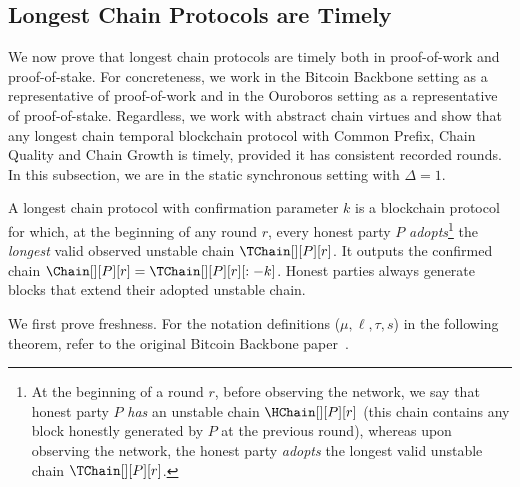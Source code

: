 \subsection{Longest Chain Protocols are Timely}

We now prove that longest chain protocols are timely both in proof-of-work and proof-of-stake.
For concreteness, we work in the Bitcoin Backbone setting
as a representative of proof-of-work and in the Ouroboros setting
as a representative of proof-of-stake.
Regardless, we work with abstract chain virtues
and show that any longest chain
temporal blockchain protocol with Common Prefix,
Chain Quality and Chain Growth is timely,
provided it has consistent recorded rounds.
In this subsection, we are in the
static synchronous setting with $\Delta = 1$.

\begin{definition}
  A longest chain protocol with confirmation parameter $k$
  is a blockchain protocol for which,
  at the beginning of any round $r$, every honest party $P$ \emph{adopts}\footnote{
    At the beginning of a round $r$, before observing the network, we say that
    honest party $P$ \emph{has} an unstable chain $\HChain[][P][r]$ (this chain
    contains any block honestly generated by $P$ at the previous round), whereas
    upon observing the network, the honest party \emph{adopts} the longest
    valid unstable chain $\TChain[][P][r]$.
  }
  the \emph{longest} valid observed unstable chain $\TChain[][P][r]$. It outputs the
  confirmed chain $\Chain[][P][r] = \TChain[][P][r][:-k]$.
  Honest parties always generate blocks that extend their adopted unstable chain.
\end{definition}

We first prove freshness.
For the notation definitions ($\mu, \ell, \tau, s$)
in the following theorem, refer to the original Bitcoin
Backbone paper~\cite{backbone-new}.

